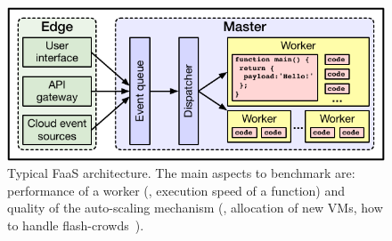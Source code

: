 \begin{figure}[!t]
\begin{center}
\includegraphics[scale=0.7]{bilder/FaaS}
\caption{Typical FaaS architecture. The main aspects to benchmark are: performance of a worker (\ie, execution speed of a function) and quality of the auto-scaling mechanism (\eg, allocation of new VMs, how to handle flash-crowds~\cite{jung2002flash}).\label{fig:faas_arch}}
\end{center}
\end{figure}

